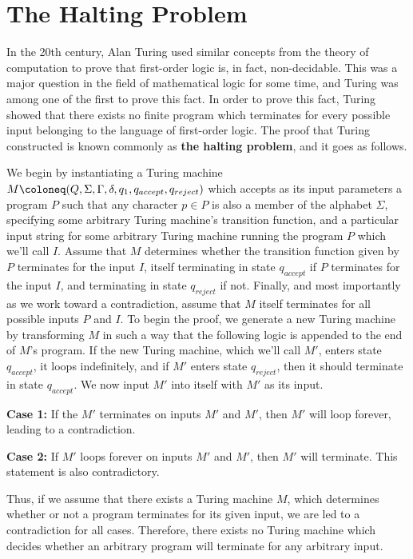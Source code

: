 \documentclass{article}
\begin{document}
\section{The Halting Problem}
In the 20th century, Alan Turing used similar concepts from the theory of computation to prove that first-order logic is, in fact, non-decidable.  This was a major question in the field of mathematical logic for some time, and Turing was among one of the first to prove this fact.  In order to prove this fact, Turing showed that there exists no finite program which terminates for every possible input belonging to the language of first-order logic.  The proof that Turing constructed is known commonly as \textbf{the halting problem}, and it goes as follows. \cite{7}
\begin{prf}
	We begin by instantiating a Turing machine $M \coloneq (Q, \Sigma, \Gamma, \delta, q_{1}, \newline q_{accept}, q_{reject})$ which accepts as its input parameters a program $P$ such that any character $p \in P$ is also a member of the alphabet $\Sigma$, specifying some arbitrary Turing machine's transition function, and a particular input string for some arbitrary Turing machine running the program $P$ which we'll call $I$.  Assume that $M$ determines whether the transition function given by $P$ terminates for the input $I$, itself terminating in state $q_{accept}$ if $P$ terminates for the input $I$, and terminating in state $q_{reject}$ if not.  Finally, and most importantly as we work toward a contradiction, assume that $M$ itself terminates for all possible inputs $P$ and $I$.  To begin the proof, we generate a new Turing machine by transforming $M$ in such a way that the following logic is appended to the end of $M$'s program. If the new Turing machine, which we'll call $M'$, enters state $q_{accept}$, it loops indefinitely, and if $M'$ enters state $q_{reject}$, then it should terminate in state $q_{accept}$.  We now input $M'$ into itself with $M'$ as its input.\\
\begin{adjustwidth}{0.5cm}{}
	\textbf{Case 1:} If the $M'$ terminates on inputs $M'$ and $M'$, then $M'$ will loop forever, leading to a contradiction.\\
\end{adjustwidth}
\begin{adjustwidth}{0.5cm}{}
	\textbf{Case 2:} If $M'$ loops forever on inputs $M'$ and $M'$, then $M'$ will terminate. This statement is also contradictory.\\
\end{adjustwidth}
	\noindent Thus, if we assume that there exists a Turing machine $M$, which determines whether or not a program terminates for its given input, we are led to a contradiction for all cases. Therefore, there exists no Turing machine which decides whether an arbitrary program will terminate for any arbitrary input.\cite{8} \qedsymbol
\end{prf}
\end{document}
